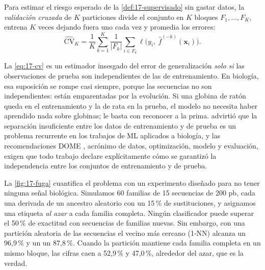 Para estimar el riesgo esperado de la \cref{def:17-supervisado} sin gastar datos, la \emph{validación cruzada} de $K$ particiones divide el conjunto en $K$ bloques $F_1,\dots,F_K$, entrena $K$ veces dejando fuera uno cada vez y promedia los errores:
\begin{equation}\label{eq:17-cv}
\widehat{\mathrm{CV}}_K = \frac{1}{K}\sum_{k=1}^{K}\frac{1}{|F_k|}\sum_{i\in F_k}\ell\big(y_i,\ \hat f^{(-k)}(\mathbf{x}_i)\big).
\end{equation}

\begin{simbolos}
\end{simbolos}

La \cref{eq:17-cv} es un estimador insesgado del error de generalización \emph{solo si} las observaciones de prueba son independientes de las de entrenamiento. En biología, esa suposición se rompe casi siempre, porque las secuencias no son independientes: están emparentadas por la evolución. Si una globina de ratón queda en el entrenamiento y la de rata en la prueba, el modelo no necesita haber aprendido nada sobre globinas; le basta con reconocer a la prima. \textcite{c17-jones2019} advirtió que la separación insuficiente entre los datos de entrenamiento y de prueba es un problema recurrente en los trabajos de ML aplicados a biología, y las recomendaciones DOME \parencite{c17-walsh2021}, acrónimo de datos, optimización, modelo y evaluación, exigen que todo trabajo declare explícitamente cómo se garantizó la independencia entre los conjuntos de entrenamiento y de prueba.

La \cref{fig:17-fuga} cuantifica el problema con un experimento diseñado para no tener ninguna señal biológica. Simulamos 60 familias de 15 secuencias de 200 pb, cada una derivada de un ancestro aleatorio con un 15\,\% de sustituciones, y asignamos una etiqueta \emph{al azar} a cada familia completa. Ningún clasificador puede superar el 50\,\% de exactitud con secuencias de familias nuevas. Sin embargo, con una partición aleatoria de las secuencias el vecino más cercano (1-NN) alcanza un 96,9\,\% y un  un 87,8\,\%. Cuando la partición mantiene cada familia completa en un mismo bloque, las cifras caen a 52,9\,\% y 47,0\,\%, alrededor del azar, que es la verdad.


